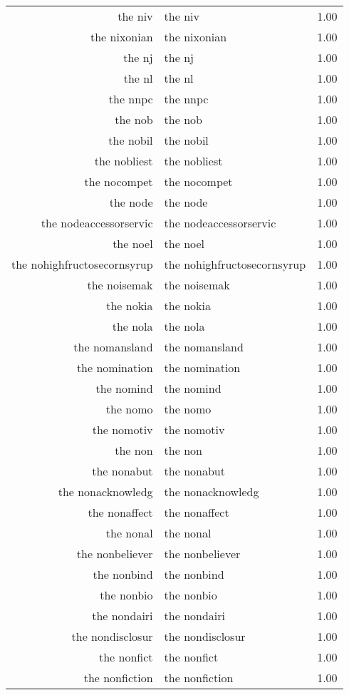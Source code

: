 \begin{table}[ht]
\begin{tabular}{rlr}
  the niv & the niv & 1.00 \\ 
  the nixonian & the nixonian & 1.00 \\ 
  the nj & the nj & 1.00 \\ 
  the nl & the nl & 1.00 \\ 
  the nnpc & the nnpc & 1.00 \\ 
  the nob & the nob & 1.00 \\ 
  the nobil & the nobil & 1.00 \\ 
  the nobliest & the nobliest & 1.00 \\ 
  the nocompet & the nocompet & 1.00 \\ 
  the node & the node & 1.00 \\ 
  the nodeaccessorservic & the nodeaccessorservic & 1.00 \\ 
  the noel & the noel & 1.00 \\ 
  the nohighfructosecornsyrup & the nohighfructosecornsyrup & 1.00 \\ 
  the noisemak & the noisemak & 1.00 \\ 
  the nokia & the nokia & 1.00 \\ 
  the nola & the nola & 1.00 \\ 
  the nomansland & the nomansland & 1.00 \\ 
  the nomination & the nomination & 1.00 \\ 
  the nomind & the nomind & 1.00 \\ 
  the nomo & the nomo & 1.00 \\ 
  the nomotiv & the nomotiv & 1.00 \\ 
  the non & the non & 1.00 \\ 
  the nonabut & the nonabut & 1.00 \\ 
  the nonacknowledg & the nonacknowledg & 1.00 \\ 
  the nonaffect & the nonaffect & 1.00 \\ 
  the nonal & the nonal & 1.00 \\ 
  the nonbeliever & the nonbeliever & 1.00 \\ 
  the nonbind & the nonbind & 1.00 \\ 
  the nonbio & the nonbio & 1.00 \\ 
  the nondairi & the nondairi & 1.00 \\ 
  the nondisclosur & the nondisclosur & 1.00 \\ 
  the nonfict & the nonfict & 1.00 \\ 
  the nonfiction & the nonfiction & 1.00 \\ 

\end{tabular}
\end{table}
